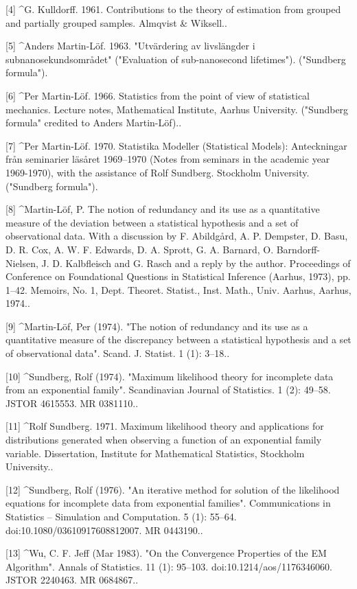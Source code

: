 [4]
^G. Kulldorff. 1961. Contributions to the theory of estimation from grouped and partially grouped samples. Almqvist & Wiksell..

[5]
^Anders Martin-Löf. 1963. "Utvärdering av livslängder i subnanosekundsområdet" ("Evaluation of sub-nanosecond lifetimes"). ("Sundberg formula").

[6]
^Per Martin-Löf. 1966. Statistics from the point of view of statistical mechanics. Lecture notes, Mathematical Institute, Aarhus University. ("Sundberg formula" credited to Anders Martin-Löf)..

[7]
^Per Martin-Löf. 1970. Statistika Modeller (Statistical Models): Anteckningar från seminarier läsåret 1969–1970 (Notes from seminars in the academic year 1969-1970), with the assistance of Rolf Sundberg. Stockholm University. ("Sundberg formula").

[8]
^Martin-Löf, P. The notion of redundancy and its use as a quantitative measure of the deviation between a statistical hypothesis and a set of observational data. With a discussion by F. Abildgård, A. P. Dempster, D. Basu, D. R. Cox, A. W. F. Edwards, D. A. Sprott, G. A. Barnard, O. Barndorff-Nielsen, J. D. Kalbfleisch and G. Rasch and a reply by the author. Proceedings of Conference on Foundational Questions in Statistical Inference (Aarhus, 1973), pp. 1–42. Memoirs, No. 1, Dept. Theoret. Statist., Inst. Math., Univ. Aarhus, Aarhus, 1974..

[9]
^Martin-Löf, Per (1974). "The notion of redundancy and its use as a quantitative measure of the discrepancy between a statistical hypothesis and a set of observational data". Scand. J. Statist. 1 (1): 3–18..

[10]
^Sundberg, Rolf (1974). "Maximum likelihood theory for incomplete data from an exponential family". Scandinavian Journal of Statistics. 1 (2): 49–58. JSTOR 4615553. MR 0381110..

[11]
^Rolf Sundberg. 1971. Maximum likelihood theory and applications for distributions generated when observing a function of an exponential family variable. Dissertation, Institute for Mathematical Statistics, Stockholm University..

[12]
^Sundberg, Rolf (1976). "An iterative method for solution of the likelihood equations for incomplete data from exponential families". Communications in Statistics – Simulation and Computation. 5 (1): 55–64. doi:10.1080/03610917608812007. MR 0443190..

[13]
^Wu, C. F. Jeff (Mar 1983). "On the Convergence Properties of the EM Algorithm". Annals of Statistics. 11 (1): 95–103. doi:10.1214/aos/1176346060. JSTOR 2240463. MR 0684867..


